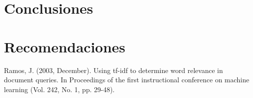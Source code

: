 \documentclass{llncs}
\begin{document}
\section{Conclusiones}\label{sec:conc}


\section{Recomendaciones}\label{sec:rec}



%
%
\begin{thebibliography}{}
%

Ramos, J. (2003, December). Using tf-idf to determine word relevance in
document queries. In Proceedings of the first instructional conference on
machine learning (Vol. 242, No. 1, pp. 29-48).

\end{thebibliography}
\clearpage
{} %
\renewcommand{\indexname}{Subject Index}

\end{document}
